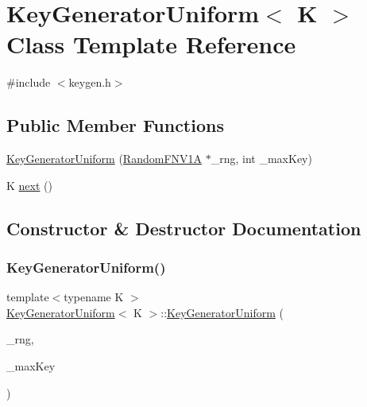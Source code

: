 \hypertarget{classKeyGeneratorUniform}{}\section{Key\+Generator\+Uniform$<$ K $>$ Class Template Reference}
\label{classKeyGeneratorUniform}


{\ttfamily \#include $<$keygen.\+h$>$}

\subsection*{Public Member Functions}
\begin{DoxyCompactItemize}
\item 
\hyperlink{classKeyGeneratorUniform_ad1516dcb2fa995f12e729b2ee4fb62b2}{Key\+Generator\+Uniform} (\hyperlink{classRandomFNV1A}{Random\+F\+N\+V1A} $\ast$\+\_\+rng, int \+\_\+max\+Key)
\item 
K \hyperlink{classKeyGeneratorUniform_a67fe5465611f10969b06e5d9d7c14d04}{next} ()
\end{DoxyCompactItemize}


\subsection{Constructor \& Destructor Documentation}
\mbox{\label{classKeyGeneratorUniform_ad1516dcb2fa995f12e729b2ee4fb62b2}} 
\subsubsection{\texorpdfstring{Key\+Generator\+Uniform()}{KeyGeneratorUniform()}}
{\footnotesize\ttfamily template$<$typename K $>$ \\
\hyperlink{classKeyGeneratorUniform}{Key\+Generator\+Uniform}$<$ K $>$\+::\hyperlink{classKeyGeneratorUniform}{Key\+Generator\+Uniform} (\begin{DoxyParamCaption}\item[{\hyperlink{classRandomFNV1A}{Random\+F\+N\+V1A} $\ast$}]{\+\_\+rng,  }\item[{int}]{\+\_\+max\+Key }\end{DoxyParamCaption})\hspace{0.3cm}{\ttfamily [inline]}}



